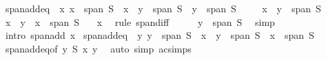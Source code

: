 \begin{isabellebody}
\isamarkupfalse%
\ span{\isacharunderscore}{\kern0pt}add{\isacharunderscore}{\kern0pt}eq{\isacharcolon}{\kern0pt}\ \ x{\isacharcolon}{\kern0pt}\ {\isachardoublequoteopen}x\ {\isasymin}\ span\ S{\isachardoublequoteclose}\ \ {\isachardoublequoteopen}x\ {\isacharplus}{\kern0pt}\ y\ {\isasymin}\ span\ S\ {\isasymlongleftrightarrow}\ y\ {\isasymin}\ span\ S{\isachardoublequoteclose}\isanewline
%
\isadelimproof
%
\endisadelimproof
%
\isatagproof
{}\isamarkupfalse%
\isanewline
\ \ \isamarkupfalse%
\ {\isacharasterisk}{\kern0pt}{\isacharcolon}{\kern0pt}\ {\isachardoublequoteopen}x\ {\isacharplus}{\kern0pt}\ y\ {\isasymin}\ span\ S{\isachardoublequoteclose}\isanewline
\ \ \isamarkupfalse%
\ {\isachardoublequoteopen}{\isacharparenleft}{\kern0pt}x\ {\isacharplus}{\kern0pt}\ y{\isacharparenright}{\kern0pt}\ {\isacharminus}{\kern0pt}\ x\ {\isasymin}\ span\ S{\isachardoublequoteclose}\ \isamarkupfalse%
\ {\isacharasterisk}{\kern0pt}\ x\ \isamarkupfalse%
\ {\isacharparenleft}{\kern0pt}rule\ span{\isacharunderscore}{\kern0pt}diff{\isacharparenright}{\kern0pt}\isanewline
\ \ \isamarkupfalse%
\ \isamarkupfalse%
\ {\isachardoublequoteopen}y\ {\isasymin}\ span\ S{\isachardoublequoteclose}\ \isamarkupfalse%
\ simp\isanewline
{}\isamarkupfalse%
\ {\isacharparenleft}{\kern0pt}intro\ span{\isacharunderscore}{\kern0pt}add\ x{\isacharparenright}{\kern0pt}%
\endisatagproof
{\isafoldproof}%
%
\isadelimproof
\isanewline
%
\endisadelimproof
\isanewline
{}\isamarkupfalse%
\ span{\isacharunderscore}{\kern0pt}add{\isacharunderscore}{\kern0pt}eq{}{\isacharcolon}{\kern0pt}\ \ y{\isacharcolon}{\kern0pt}\ {\isachardoublequoteopen}y\ {\isasymin}\ span\ S{\isachardoublequoteclose}\ \ {\isachardoublequoteopen}x\ {\isacharplus}{\kern0pt}\ y\ {\isasymin}\ span\ S\ {\isasymlongleftrightarrow}\ x\ {\isasymin}\ span\ S{\isachardoublequoteclose}\isanewline
%
\isadelimproof
\ \ %
\endisadelimproof
%
\isatagproof
{}\isamarkupfalse%
\ span{\isacharunderscore}{\kern0pt}add{\isacharunderscore}{\kern0pt}eq{\isacharbrackleft}{\kern0pt}of\ y\ S\ x{\isacharbrackright}{\kern0pt}\ y\ \isamarkupfalse%
\ {\isacharparenleft}{\kern0pt}auto\ simp{\isacharcolon}{\kern0pt}\ ac{\isacharunderscore}{\kern0pt}simps{\isacharparenright}{\kern0pt}%
\endisatagproof
{\isafoldproof}%
%
\isadelimproof
\isanewline
%
\endisadelimproof

\end{isabellebody}
